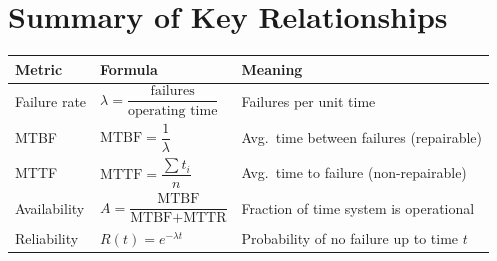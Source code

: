 \documentclass[12pt,a4paper]{article}
\begin{document}
\section{Summary of Key Relationships}

\begin{center}
\renewcommand{\arraystretch}{1.5}
\begin{tabular}{|l|l|l|}
\hline
\textbf{Metric} & \textbf{Formula} & \textbf{Meaning} \\
\hline
Failure rate & $\lambda = \dfrac{\text{failures}}{\text{operating time}}$ & Failures per unit time \\[6pt]
MTBF & $\text{MTBF} = \dfrac{1}{\lambda}$ & Avg.\ time between failures (repairable) \\[6pt]
MTTF & $\text{MTTF} = \dfrac{\sum t_i}{n}$ & Avg.\ time to failure (non-repairable) \\[6pt]
Availability & $A = \dfrac{\text{MTBF}}{\text{MTBF}+\text{MTTR}}$ & Fraction of time system is operational \\[6pt]
Reliability & $R(t) = e^{-\lambda t}$ & Probability of no failure up to time $t$ \\
\hline
\end{tabular}
\end{center}
\end{document}
